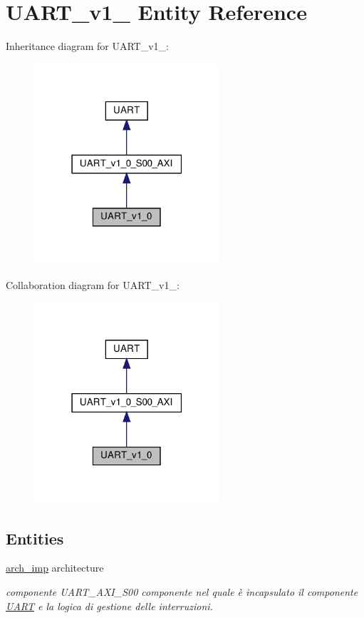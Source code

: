 \hypertarget{classUART__v1__0}{}\section{U\+A\+R\+T\+\_\+v1\+\_ Entity Reference}
\label{classUART__v1__0}


Inheritance diagram for U\+A\+R\+T\+\_\+v1\+\_\+:
\nopagebreak
\begin{figure}[H]
\begin{center}
\leavevmode
\includegraphics[width=195pt]{classUART__v1__0__inherit__graph}
\end{center}
\end{figure}


Collaboration diagram for U\+A\+R\+T\+\_\+v1\+\_\+:
\nopagebreak
\begin{figure}[H]
\begin{center}
\leavevmode
\includegraphics[width=195pt]{classUART__v1__0__coll__graph}
\end{center}
\end{figure}
\subsection*{Entities}
\begin{DoxyCompactItemize}
\item 
\hyperlink{classUART__v1__0_1_1arch__imp}{arch\+\_\+imp} architecture
\begin{DoxyCompactList}\small\item\em componente U\+A\+R\+T\+\_\+\+A\+X\+I\+\_\+\+S00  componente nel quale è incapsulato il componente \hyperlink{structUART}{U\+A\+RT} e la logica di gestione delle interruzioni. \end{DoxyCompactList}\end{DoxyCompactItemize}
